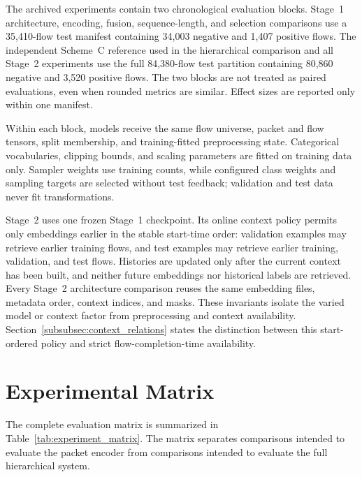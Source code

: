 \documentclass[11pt,fleqn]{report}
\begin{document}
The archived experiments contain two chronological evaluation blocks. Stage~1
architecture, encoding, fusion, sequence-length, and selection comparisons use
a 35,410-flow test manifest containing 34,003 negative and 1,407 positive
flows. The independent Scheme~C reference used in the hierarchical comparison
and all Stage~2 experiments use the full 84,380-flow test partition containing
80,860 negative and 3,520 positive flows. The two
blocks are not treated as paired evaluations, even when rounded metrics are
similar. Effect sizes are reported only within one manifest.

Within each block, models receive the same flow universe, packet and flow
tensors, split membership, and training-fitted preprocessing state. Categorical
vocabularies, clipping bounds, and scaling parameters are fitted on training
data only. Sampler weights use training counts, while configured class weights
and sampling targets are selected without test feedback; validation and test
data never fit transformations.

Stage~2 uses one frozen Stage~1 checkpoint. Its online context policy permits
only embeddings earlier in the stable start-time order: validation examples may
retrieve earlier training flows, and test examples may retrieve earlier
training, validation, and test flows. Histories are updated only after the
current context has been built, and neither future embeddings nor historical
labels are retrieved. Every Stage~2 architecture comparison reuses the same
embedding files, metadata order, context indices, and masks. These invariants
isolate the varied model or context factor from preprocessing and context
availability. Section~\ref{subsubsec:context_relations} states the distinction
between this start-ordered policy and strict flow-completion-time availability.
\section{Experimental Matrix}
\label{subsec:experimental_matrix}

The complete evaluation matrix is summarized in
Table~\ref{tab:experiment_matrix}. The matrix separates comparisons intended
to evaluate the packet encoder from comparisons intended to evaluate the full
hierarchical system.
\end{document}
